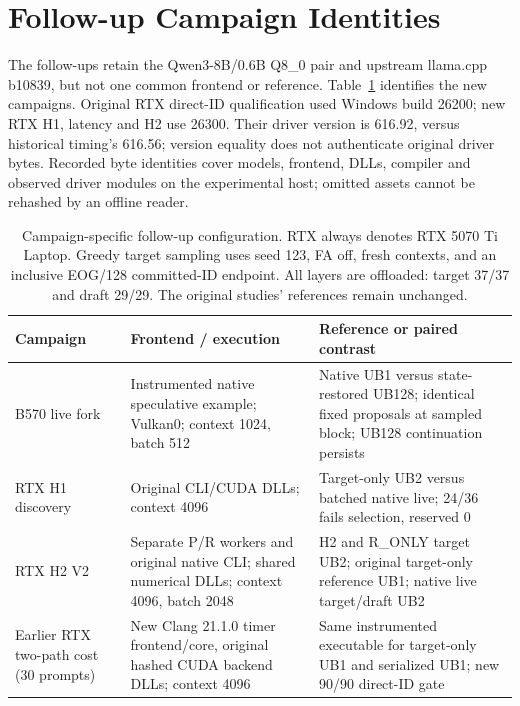 \section{Follow-up Campaign Identities}
\label{app:followupconfigs}

The follow-ups retain the Qwen3-8B/0.6B Q8\_0 pair and upstream llama.cpp b10839, but not one common frontend or reference. Table~\ref{tab:followupconfigs} identifies the new campaigns. Original RTX direct-ID qualification used Windows build 26200; new RTX H1, latency and H2 use 26300. Their driver version is 616.92, versus historical timing's 616.56; version equality does not authenticate original driver bytes. Recorded byte identities cover models, frontend, DLLs, compiler and observed driver modules on the experimental host; omitted assets cannot be rehashed by an offline reader.

\begin{table}[t]
\caption{Campaign-specific follow-up configuration. RTX always denotes RTX 5070 Ti Laptop. Greedy target sampling uses seed 123, FA off, fresh contexts, and an inclusive EOG/128 committed-ID endpoint. All layers are offloaded: target 37/37 and draft 29/29. The original studies' references remain unchanged.}
\label{tab:followupconfigs}
\centering
\begin{tabular}{>{\raggedright\arraybackslash}p{1.15in}>{\raggedright\arraybackslash}p{2.15in}>{\raggedright\arraybackslash}p{2.45in}}
\toprule
Campaign & Frontend / execution & Reference or paired contrast \\
\midrule
B570 live fork & Instrumented native speculative example; Vulkan0; context 1024, batch 512 & Native UB1 versus state-restored UB128; identical fixed proposals at sampled block; UB128 continuation persists \\
RTX H1 discovery & Original CLI/CUDA DLLs; context 4096 & Target-only UB2 versus batched native live; 24/36 fails selection, reserved 0 \\
RTX H2 V2 & Separate P/R workers and original native CLI; shared numerical DLLs; context 4096, batch 2048 & H2 and R\_ONLY target UB2; original target-only reference UB1; native live target/draft UB2 \\
Earlier RTX two-path cost (30 prompts) & New Clang 21.1.0 timer frontend/core, original hashed CUDA backend DLLs; context 4096 & Same instrumented executable for target-only UB1 and serialized UB1; new 90/90 direct-ID gate \\
\bottomrule
\end{tabular}
\end{table}

